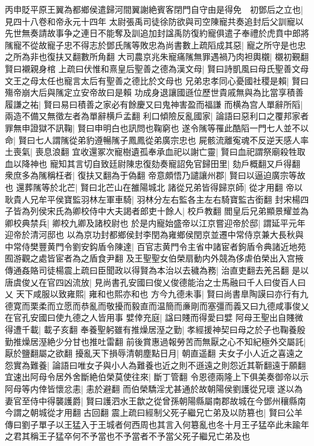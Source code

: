 丙申貶平原王翼為都鄉侯遣歸河間翼謝絶賓客閉門自守由是得免　初鄧后之立也|{
	見四十八卷和帝永元十四年}
太尉張禹司徒徐防欲與司空陳寵共奏追封后父訓寵以先世無奏請故事争之連日不能奪及訓追加封諡禹防復約寵俱遣子奉禮於虎賁中郎將隲寵不從故寵子忠不得志於鄧氏隲等敗忠為尚書數上疏䧟成其惡|{
	寵之所守是也忠之所為非也復扶又翻數所角翻}
大司農京兆朱寵痛隲無罪遇禍乃肉袒輿櫬|{
	櫬初覲翻賢曰襯親身棺}
上疏曰伏惟和熹皇后聖善之德為漢文母|{
	賢曰詩凱風曰母氏聖善文母文王之母太任也寵言太后有聖善之德比於文母也}
兄弟忠孝同心憂國社稷是賴|{
	賢曰殤帝崩大后與隲定立安帝故曰是賴}
功成身退讓國遜位歷世貴戚無與為比當享積善履謙之祐|{
	賢曰易曰積善之家必有餘慶又曰鬼神害盈而福謙}
而横為宫人單辭所䧟|{
	兩造不備又無徵左者為單辭横戶孟翻}
利口傾險反亂國家|{
	論語曰惡利口之覆邦家者}
罪無申證獄不訊鞠|{
	賢曰申明白也訊問也鞠窮也}
遂令隲等罹此酷䧟一門七人並不以命|{
	賢曰七人謂隲從弟豹遵暢隲子鳳鳳從弟廣宗忠也}
屍骸流離寃魂不反逆天感人率土喪氣|{
	喪息浪翻}
宜收還冢次寵樹遺孤奉承血祀以謝亡靈|{
	賢曰血祀謂祭廟殺牲取血以降神也}
寵知其言切自致廷尉陳忠復劾奏寵詔免官歸田里|{
	劾戶概翻又戶得翻}
衆庶多為隲稱枉者|{
	復扶又翻為于偽翻}
帝意頗悟乃譴讓州郡|{
	賢曰以逼迫廣宗等故也}
還葬隲等於北芒|{
	賢曰北芒山在雒陽城北}
諸從兄弟皆得歸京師|{
	從才用翻}
帝以耿貴人兄牟平侯寶監羽林左軍車騎|{
	羽林分左右監各主左右騎寶監古銜翻}
封宋楊四子皆為列侯宋氏為卿校侍中大夫謁者郎吏十餘人|{
	校戶教翻}
閻皇后兄弟顯景耀並為卿校典禁兵|{
	卿校九卿及諸校尉也}
於是内寵始盛帝以江京嘗迎帝於邸|{
	謂延平元年迎帝於清河邸也}
以為京功封都鄉侯封李閏為雍鄉侯閏京並遷中常侍京兼大長秋與中常侍樊豐黄門令劉安鈎盾令陳達|{
	百官志黄門令主省中諸宦者鉤盾令典諸近地苑囿游觀之處皆宦者為之盾食尹翻}
及王聖聖女伯榮扇動内外競為侈虐伯榮出入宫掖傳通姦賂司徒楊震上疏曰臣聞政以得賢為本治以去穢為務|{
	治直吏翻去羌呂翻}
是以唐虞俊乂在官四凶流放|{
	見尚書孔安國曰俊乂俊德能治之士馬融曰千人曰俊百人曰乂}
天下咸服以致雍熙|{
	雍和也熙亦和也}
方今九德未事|{
	賢曰尚書臯陶謨曰亦行有九德寛而栗柔而立愿而恭亂而敬擾而毅直而温簡而亷剛而塞彊而義又曰九德咸事俊乂在官孔安國曰使九德之人皆用事}
嬖倖充庭|{
	諡曰賤而得愛曰嬖}
阿母王聖出自賤微得遭千載|{
	載子亥翻}
奉養聖躬雖有推燥居溼之勤|{
	孝經援神契曰母之於子也鞠養殷勤推燥居溼絶少分甘也推吐雷翻}
前後賞惠過報勞苦而無厭之心不知紀極外交屬託|{
	厭於鹽翻屬之欲翻}
擾亂天下損辱清朝塵點日月|{
	朝直遥翻}
夫女子小人近之喜遠之怨實為難養|{
	論語曰唯女子與小人為難養也近之則不遜遠之則怨近其靳翻遠于願翻}
宜速出阿母令居外舍斷絶伯榮莫使往來|{
	斷丁管翻}
令恩德兩隆上下俱美奏御帝以示阿母等内倖皆懷忿恚|{
	恚於避翻}
而伯榮驕淫尤甚通於故朝陽侯劉護從兄瓌遂以為妻官至侍中得襲護爵|{
	賢曰護泗水王歙之從曾孫朝陽縣屬南郡故城在今鄧州穰縣南今謂之朝城從才用翻古回翻}
震上疏曰經制父死子繼兄亡弟及以防篡也|{
	賢曰公羊傳曰劉子單子以王猛入于王城者何西周也其言入何簒亂也冬十月王子猛卒此未踰年之君其稱王子猛卒何不予當也不予當者不予當父死子繼兄亡弟及也}
